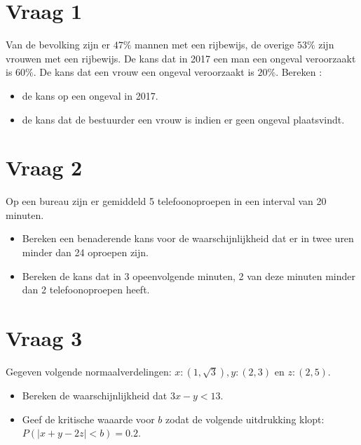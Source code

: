 \documentclass{article}
\begin{document}
 \section{Vraag 1}
  Van de bevolking zijn er $47\%$ mannen met een rijbewijs, de overige $53\%$ zijn vrouwen met een rijbewijs. De kans dat in 2017 een man een ongeval veroorzaakt is $60\%$. De kans dat een vrouw een ongeval veroorzaakt is $20\%$. Bereken :
 \begin{itemize}
    \item de kans op een ongeval in 2017.
    \item de kans dat de bestuurder een vrouw is indien er geen ongeval plaatsvindt.
 \end{itemize}

 \section{Vraag 2}
 Op een bureau zijn er gemiddeld 5 telefoonoproepen in een interval van 20 minuten.
 \begin{itemize}
  \item Bereken een benaderende kans voor de waarschijnlijkheid dat er in twee uren minder dan 24 oproepen zijn.
  \item Bereken de kans dat in 3 opeenvolgende minuten, 2 van deze minuten minder dan 2 telefoonoproepen heeft.
 \end{itemize}
 
 \section{Vraag 3}
 Gegeven volgende normaalverdelingen: $x:(1,\sqrt{3}), y:(2, 3)$ en $z:(2, 5)$.
 \begin{itemize}
  \item Bereken de waarschijnlijkheid dat $3x - y < 13$.
  \item Geef de kritische waaarde voor $b$ zodat de volgende uitdrukking klopt: $P(|x + y - 2z| < b) = 0.2$.
 \end{itemize}
\end{document}
